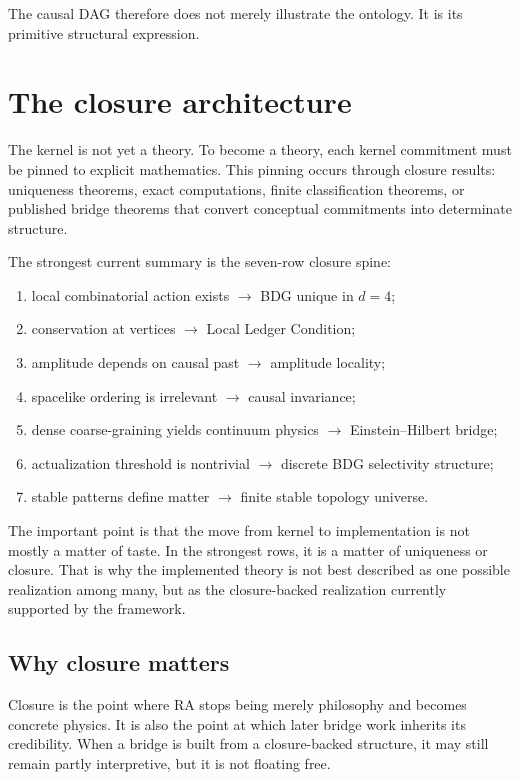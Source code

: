 \documentclass[11pt]{article}
\begin{document}
The causal DAG therefore does not merely illustrate the ontology. It is its primitive structural expression.

\section{The closure architecture}\label{sec:closures}
The kernel is not yet a theory. To become a theory, each kernel commitment must be pinned to explicit mathematics. This pinning occurs through closure results: uniqueness theorems, exact computations, finite classification theorems, or published bridge theorems that convert conceptual commitments into determinate structure.

The strongest current summary is the seven-row closure spine:
\begin{enumerate}[label=\arabic*.]
    \item local combinatorial action exists $\rightarrow$ BDG unique in $d=4$;
    \item conservation at vertices $\rightarrow$ Local Ledger Condition;
    \item amplitude depends on causal past $\rightarrow$ amplitude locality;
    \item spacelike ordering is irrelevant $\rightarrow$ causal invariance;
    \item dense coarse-graining yields continuum physics $\rightarrow$ Einstein--Hilbert bridge;
    \item actualization threshold is nontrivial $\rightarrow$ discrete BDG selectivity structure;
    \item stable patterns define matter $\rightarrow$ finite stable topology universe.
\end{enumerate}

The important point is that the move from kernel to implementation is not mostly a matter of taste. In the strongest rows, it is a matter of uniqueness or closure. That is why the implemented theory is not best described as one possible realization among many, but as the closure-backed realization currently supported by the framework.

\subsection{Why closure matters}
Closure is the point where RA stops being merely philosophy and becomes concrete physics. It is also the point at which later bridge work inherits its credibility. When a bridge is built from a closure-backed structure, it may still remain partly interpretive, but it is not floating free.
\end{document}
